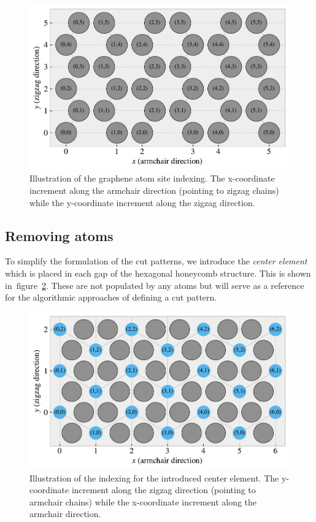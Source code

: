 \begin{figure}[h]
  \centering
  \includegraphics[width=0.7\linewidth]{figures/system/atom_indexing.pdf}
  \caption{Illustration of the graphene atom site indexing. The x-coordinate increment along the armchair direction (pointing to zigzag chains) while the y-coordinate increment along the zigzag direction.}
  \label{fig:atom_indexing}
\end{figure}


\subsection{Removing atoms}
To simplify the formulation of the cut patterns, we introduce the \textit{center element} which is placed in each gap of the hexagonal honeycomb structure. This is shown in~figure~\cref{fig:center_indexing}. These are not populated by any atoms but will serve as a reference for the algorithmic approaches of defining a cut pattern.

\begin{figure}[h]
  \centering
  \includegraphics[width=0.7\linewidth]{figures/system/center_indexing.pdf}
  \caption{Illustration of the indexing for the introduced center element. The y-coordinate increment along the zigzag direction (pointing to armchair chains) while the x-coordinate increment along the armchair direction.}
  \label{fig:center_indexing}
\end{figure}


